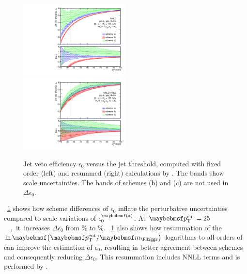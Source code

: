 \begin{figure}[t]
	\includegraphics[width=0.495\textwidth]{tex/signal/eps0_jve_fixedorder}
	\hfill
	\includegraphics[width=0.495\textwidth]{tex/signal/eps0_jve_resummed}
	\caption{Jet veto efficiency $\epsilon_0$ versus the jet \pt threshold, computed with 
	fixed order (left) and resummed (right) calculations by \jetvheto \cite{JVE:NNLL}. The 
	bands show scale uncertainties. The bands of schemes (b) and (c) are not used in 
	$\Delta\epsilon_0$.}
	\label{fig:ggF:jve_eps1}
\end{figure}

\Figure~\ref{fig:ggF:jve_eps1} shows how scheme differences of $\epsilon_0$ inflate the 
perturbative uncertainties compared to scale variations of 
$\epsilon_0^{\parenths{\text{a}}}$. At \unit{$\ptcut = 25$}{\GeV}, it increases 
$\Delta\epsilon_0$ from \% to \%. \Figure~\ref{fig:ggF:jve_eps1} also shows 
how resummation of the $\ln\parenths{\ptcut/\mH}$ logarithms to all orders of \alphaS can 
improve the estimation of $\epsilon_0$, resulting in better agreement between schemes and 
consequently reducing $\Delta\epsilon_0$. This resummation includes NNLL terms and is 
performed by \jetvheto \cite{JVE:NNLL}.

